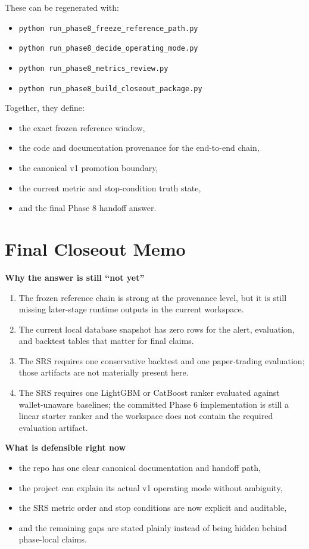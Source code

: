 \documentclass{article}
\begin{document}
These can be regenerated with:
\begin{itemize}
\item \texttt{python run\_phase8\_freeze\_reference\_path.py}
\item \texttt{python run\_phase8\_decide\_operating\_mode.py}
\item \texttt{python run\_phase8\_metrics\_review.py}
\item \texttt{python run\_phase8\_build\_closeout\_package.py}
\end{itemize}

Together, they define:
\begin{itemize}
\item the exact frozen reference window,
\item the code and documentation provenance for the end-to-end chain,
\item the canonical v1 promotion boundary,
\item the current metric and stop-condition truth state,
\item and the final Phase 8 handoff answer.
\end{itemize}

\section*{Final Closeout Memo}
\textbf{Why the answer is still ``not yet''}
\begin{enumerate}
\item The frozen reference chain is strong at the provenance level, but it is still missing later-stage runtime outputs in the current workspace.
\item The current local database snapshot has zero rows for the alert, evaluation, and backtest tables that matter for final claims.
\item The SRS requires one conservative backtest and one paper-trading evaluation; those artifacts are not materially present here.
\item The SRS requires one LightGBM or CatBoost ranker evaluated against wallet-unaware baselines; the committed Phase 6 implementation is still a linear starter ranker and the workspace does not contain the required evaluation artifact.
\end{enumerate}

\textbf{What is defensible right now}
\begin{itemize}
\item the repo has one clear canonical documentation and handoff path,
\item the project can explain its actual v1 operating mode without ambiguity,
\item the SRS metric order and stop conditions are now explicit and auditable,
\item and the remaining gaps are stated plainly instead of being hidden behind phase-local claims.
\end{itemize}
\end{document}

